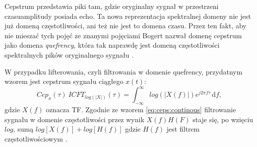 \documentclass[12pt,a4paper,twoside]{mwart}
\begin{document}
Cepstrum przedstawia piki tam, gdzie oryginalny sygnał w przestrzeni czasu\-amplitudy posiada echo. Ta nowa reprezentacja spektralnej domeny nie jest już domeną częstotliwości, ani też nie jest to domena czasu. Przez ten fakt, aby nie mieszać tych pojęć ze znanymi pojęciami Bogert nazwał domenę cepstrum jako domena \textit{quefrency}, która tak naprawdę jest domeną częstotliwości spektralnych pików oryginalnego sygnału \cite[1-4]{Transcription:Randall:CepstrumHistory} \cite[210-219]{Transcription:Bogert:FirstCepstrum}.

W przypadku lifterowania, czyli filtrowania w domenie quefrency, przydatnym wzorem jest cepstrum sygnału ciągłego $x(t)$:
\begin{equation}\label{eq:ceps:continous}
Cep_x(\tau) \ ICFT_{log(|X|)}(\tau) = \int_{-\infty}^{\infty}  log(|X(f)|)e^{j2\pi f\tau}\,\mathrm{d}f, 
\end{equation}
gdzie  $X(f)$ oznacza TF. Zgodnie ze wzorem \ref{eq:ceps:continous} filtrowanie sygnału w domenie częstotliwości przez wynik $X(f)H(F)$ staje się, po wzięciu $log$, sumą $log[X(f)] + log[H(f)]$ gdzie $H(f)$ jest filtrem częstotliwościowym \cite[25-27]{Transcription:Anssi:SignalProcessingMethods}.
\end{document}
